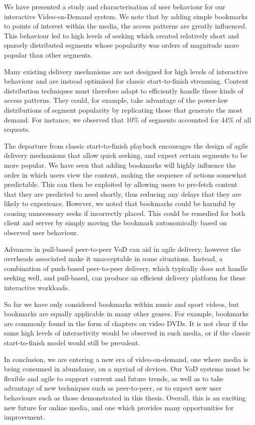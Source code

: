     We have presented a study and characterisation of user behaviour for our interactive Video-on-Demand system. We note that by adding simple bookmarks to points of interest within the media, the access patterns are greatly influenced. This behaviour led to high levels of seeking which created relatively short and sparsely distributed segments whose popularity was orders of magnitude more popular than other segments.

    Many existing delivery mechanisms are not designed for high levels of interactive behaviour and are instead optimised for classic start-to-finish streaming. Content distribution techniques must therefore adapt to efficiently handle these kinds of access patterns. They could, for example, take advantage of the power-law distributions of segment popularity by replicating those that generate the most demand. For instance, we observed that 10\% of segments accounted for 44\% of all requests.

    The departure from classic start-to-finish playback encourages the design of agile delivery mechanisms that allow quick seeking, and expect certain segments to be more popular. We have seen that adding bookmarks will highly influence the order in which users view the content, making the sequence of actions somewhat predictable. This can then be exploited by allowing users to pre-fetch content that they are predicted to need shortly, thus reducing any delays that they are likely to experience. However, we noted that bookmarks could be harmful by causing unnecessary seeks if incorrectly placed. This could be remedied for both client and server by simply moving the bookmark autonomically based on observed user behaviour.

    Advances in pull-based peer-to-peer VoD can aid in agile delivery, however the overheads associated make it unacceptable in some situations. Instead, a combination of push-based peer-to-peer delivery, which typically does not handle seeking well, and pull-based, can produce an efficient delivery platform for these interactive workloads.

    So far we have only considered bookmarks within music and sport videos, but bookmarks are equally applicable in many other genres. For example, bookmarks are commonly found in the form of chapters on video DVDs. It is not clear if the same high levels of interactivity would be observed in such media, or if the classic start-to-finish model would still be prevalent.

    In conclusion, we are entering a new era of video-on-demand, one where media is being consumed in abundance, on a myriad of devices. Our VoD systems must be flexible and agile to support current and future trends, as well as to take advantage of new techniques such as peer-to-peer, or to expect new user behaviours such as those demonstrated in this thesis. Overall, this is an exciting new future for online media, and one which provides many opportunities for improvement.

